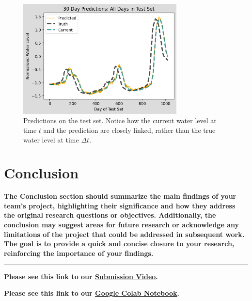 \documentclass[10pt,twocolumn,letterpaper]{article}
\begin{document}
\begin{figure}[h!]
  \centering
  \includegraphics[width=.5\textwidth, height=6cm]{test_predictions.png}
  \caption{Predictions on the test set. Notice how the current water level at time $t$ and the prediction are closely linked, rather than the true water level at time $\Delta t$.}
  \label{fig:test_predictions}
\end{figure}

\section{Conclusion}
\textbf{
The Conclusion section should summarize the main findings of your team's project, highlighting their significance and how they address the original research questions or objectives. Additionally, the conclusion may suggest areas for future research or acknowledge any limitations of the project that could be addressed in subsequent work. The goal is to provide a quick and concise closure to your research, reinforcing the importance of your findings.}
\vspace{0.5cm} 
\hrule
\vspace{0.5cm}

\textbf{Please see this link to our \href{...}{Submission Video}.} 

\textbf{Please see this link to our \href{...}{Google Colab Notebook}.} 

\vspace{0.5cm}
{\small


}
\end{document}
